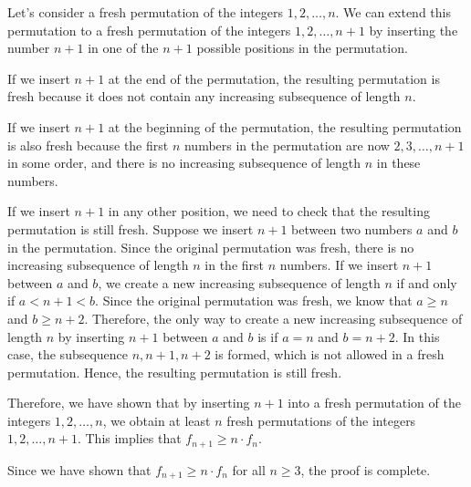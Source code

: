 Let's consider a fresh permutation of the integers \(1, 2, \dots, n\). We can extend this permutation to a fresh permutation of the integers \(1, 2, \dots, n+1\) by inserting the number \(n+1\) in one of the \(n+1\) possible positions in the permutation. 

If we insert \(n+1\) at the end of the permutation, the resulting permutation is fresh because it does not contain any increasing subsequence of length \(n\). 

If we insert \(n+1\) at the beginning of the permutation, the resulting permutation is also fresh because the first \(n\) numbers in the permutation are now \(2, 3, \dots, n+1\) in some order, and there is no increasing subsequence of length \(n\) in these numbers.

If we insert \(n+1\) in any other position, we need to check that the resulting permutation is still fresh. Suppose we insert \(n+1\) between two numbers \(a\) and \(b\) in the permutation. Since the original permutation was fresh, there is no increasing subsequence of length \(n\) in the first \(n\) numbers. If we insert \(n+1\) between \(a\) and \(b\), we create a new increasing subsequence of length \(n\) if and only if \(a < n+1 < b\). Since the original permutation was fresh, we know that \(a \geq n\) and \(b \geq n+2\). Therefore, the only way to create a new increasing subsequence of length \(n\) by inserting \(n+1\) between \(a\) and \(b\) is if \(a = n\) and \(b = n+2\). In this case, the subsequence \(n, n+1, n+2\) is formed, which is not allowed in a fresh permutation. Hence, the resulting permutation is still fresh.

Therefore, we have shown that by inserting \(n+1\) into a fresh permutation of the integers \(1, 2, \dots, n\), we obtain at least \(n\) fresh permutations of the integers \(1, 2, \dots, n+1\). This implies that \(f_{n+1} \geq n \cdot f_n\).

Since we have shown that \(f_{n+1} \geq n \cdot f_n\) for all \(n \geq 3\), the proof is complete.
